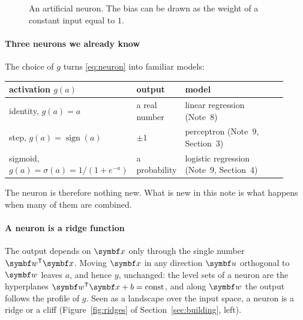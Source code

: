 \documentclass[11pt]{article}
\newcommand{\w}{\vect{w}}
\begin{document}
\begin{figure}[htbp]
\centering
{}
\caption{An artificial neuron. The bias can be drawn as the weight of a constant input equal to $1$.}
\label{fig:neuron}
\end{figure}

\paragraph{Three neurons we already know} The choice of $g$ turns \eqref{eq:neuron} into familiar models:
\begin{center}\small
\begin{tabular}{@{}L{0.36\linewidth}L{0.16\linewidth}L{0.4\linewidth}@{}}
\toprule
activation $g(a)$ & output & model \\
\midrule
identity, $g(a) = a$ & a real number & linear regression (Note~8) \\
step, $g(a) = \operatorname{sign}(a)$ & $\pm 1$ & perceptron (Note~9, Section~3) \\
sigmoid, $g(a) = \sigma(a) = 1/(1 + e^{-a})$ & a probability & logistic regression (Note~9, Section~4) \\
\bottomrule
\end{tabular}
\end{center}
The neuron is therefore nothing new. What is new in this note is what happens when many of them are combined.

\paragraph{A neuron is a ridge function} The output depends on $\x$ only through the single number $\w\T\x$. Moving
$\x$ in any direction $\vect{u}$ orthogonal to $\w$ leaves $a$, and hence $y$, unchanged: the level sets of a neuron
are the hyperplanes $\w\T\x + b = \text{const}$, and along $\w$ the output follows the profile of $g$. Seen as a
landscape over the input space, a neuron is a ridge or a cliff (Figure~\ref{fig:ridges} of Section~\ref{sec:building}, left).
\end{document}
